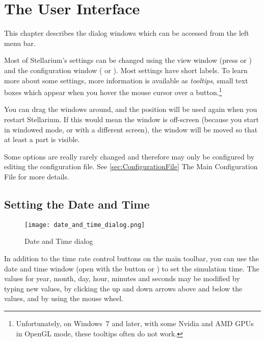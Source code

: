 

\chapter{The User Interface}
\label{ch:gui}


This chapter describes the dialog windows which can be accessed from the left menu bar.

Most of Stellarium's settings can be changed using the view window
(press  or ) and the
configuration window ( or
). Most settings have short labels. To learn more about some
settings, more information is available as \emph{tooltips}, small text
boxes which appear when you hover the mouse cursor over a
button.\footnote{Unfortunately, on Windows~7 and later, with some Nvidia
  and AMD GPUs in OpenGL mode, these tooltips often do not work.}

You can drag the
windows around, and the position will be used again when you restart
Stellarium. If this would mean the window is off-screen (because you
start in windowed mode, or with a different screen), the window will
be moved so that at least a part is visible.

Some options are really rarely changed and therefore may only be
configured by editing the configuration file.  See
\ref{sec:ConfigurationFile} The Main Configuration File for more
details.



\section{Setting the Date and Time}
\label{sec:gui:date}

\begin{figure}[htbp]
\centering\texttt{[image: date\_and\_time\_dialog.png]}
\caption{Date and Time dialog}
\label{fig:gui:date}
\end{figure}

In addition to the time rate control buttons on the main toolbar, you
can use the date and time window (open with the  
button or ) to set the simulation time. The values
for year, month, day, hour, minutes and seconds may be modified by
typing new values, by clicking the up and down arrows above and below
the values, and by using the mouse wheel.


